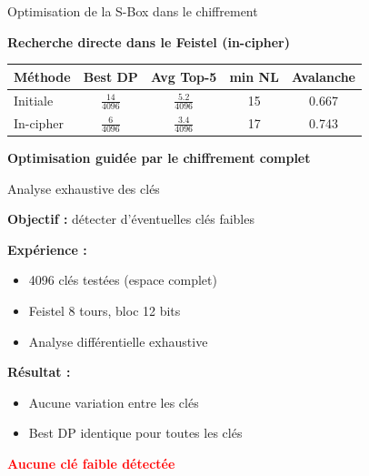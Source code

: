 \begin{frame}{Optimisation de la S-Box dans le chiffrement}

\begin{center}

\textbf{Recherche directe dans le Feistel (in-cipher)}

\vspace{0.8cm}

\renewcommand{\arraystretch}{1.5} %

\begin{tabular}{lcccc}
\toprule
\textbf{Méthode} & \textbf{Best DP} & \textbf{Avg Top-5} & \textbf{min NL} & \textbf{Avalanche} \\
\midrule
Initiale & $\frac{14}{4096}$ & $\frac{5.2}{4096}$ & 15 & 0.667 \\
\vspace{0.2cm}
In-cipher & $\frac{6}{4096}$ & $\frac{3.4}{4096}$ & 17 & 0.743 \\
\bottomrule
\end{tabular}

\vspace{1.2cm}

\textbf{Optimisation guidée par le chiffrement complet}

\vspace{0.5cm}

\end{center}

\end{frame}

\begin{frame}{Analyse exhaustive des clés}

\begin{center}

\textbf{Objectif :} détecter d’éventuelles clés faibles

\vspace{0.8cm}

\textbf{Expérience :}
\begin{itemize}
    \item 4096 clés testées (espace complet)
    \item Feistel 8 tours, bloc 12 bits
    \item Analyse différentielle exhaustive
\end{itemize}

\vspace{0.8cm}

\textbf{Résultat :}
\begin{itemize}
    \item Aucune variation entre les clés
    \item Best DP identique pour toutes les clés
\end{itemize}

\vspace{0.8cm}

\textcolor{red}{\textbf{Aucune clé faible détectée}}

\end{center}

\end{frame}

